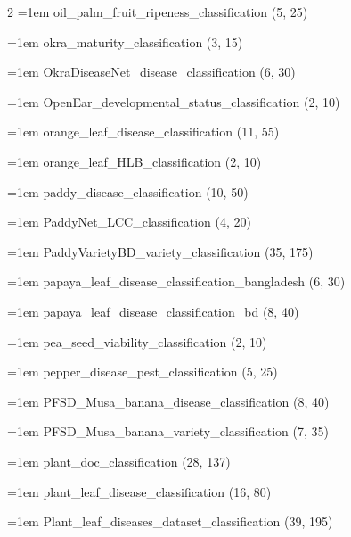 \begin{multicols}{2}
\hangindent=1em oil\_\allowbreak{}palm\_\allowbreak{}fruit\_\allowbreak{}ripeness\_\allowbreak{}classification (5, 25)\par
\hangindent=1em okra\_\allowbreak{}maturity\_\allowbreak{}classification (3, 15)\par
\hangindent=1em OkraDiseaseNet\_\allowbreak{}disease\_\allowbreak{}classification (6, 30)\par
\hangindent=1em OpenEar\_\allowbreak{}developmental\_\allowbreak{}status\_\allowbreak{}classification (2, 10)\par
\hangindent=1em orange\_\allowbreak{}leaf\_\allowbreak{}disease\_\allowbreak{}classification (11, 55)\par
\hangindent=1em orange\_\allowbreak{}leaf\_\allowbreak{}HLB\_\allowbreak{}classification (2, 10)\par
\hangindent=1em paddy\_\allowbreak{}disease\_\allowbreak{}classification (10, 50)\par
\hangindent=1em PaddyNet\_\allowbreak{}LCC\_\allowbreak{}classification (4, 20)\par
\hangindent=1em PaddyVarietyBD\_\allowbreak{}variety\_\allowbreak{}classification (35, 175)\par
\hangindent=1em papaya\_\allowbreak{}leaf\_\allowbreak{}disease\_\allowbreak{}classification\_\allowbreak{}bangladesh (6, 30)\par
\hangindent=1em papaya\_\allowbreak{}leaf\_\allowbreak{}disease\_\allowbreak{}classification\_\allowbreak{}bd (8, 40)\par
\hangindent=1em pea\_\allowbreak{}seed\_\allowbreak{}viability\_\allowbreak{}classification (2, 10)\par
\hangindent=1em pepper\_\allowbreak{}disease\_\allowbreak{}pest\_\allowbreak{}classification (5, 25)\par
\hangindent=1em PFSD\_\allowbreak{}Musa\_\allowbreak{}banana\_\allowbreak{}disease\_\allowbreak{}classification (8, 40)\par
\hangindent=1em PFSD\_\allowbreak{}Musa\_\allowbreak{}banana\_\allowbreak{}variety\_\allowbreak{}classification (7, 35)\par
\hangindent=1em plant\_\allowbreak{}doc\_\allowbreak{}classification (28, 137)\par
\hangindent=1em plant\_\allowbreak{}leaf\_\allowbreak{}disease\_\allowbreak{}classification (16, 80)\par
\hangindent=1em Plant\_\allowbreak{}leaf\_\allowbreak{}diseases\_\allowbreak{}dataset\_\allowbreak{}classification (39, 195)\par

\end{multicols}
